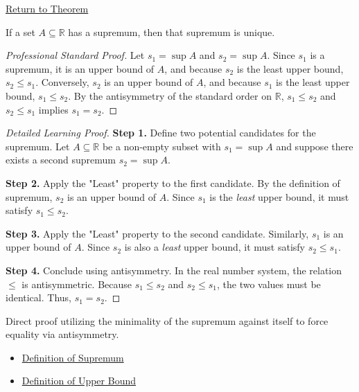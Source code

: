 \newpage
{}
\label{prf:uniqueness-of-the-supremum}

\begin{remark*}[Return]
\hyperref[prop:uniqueness-of-the-supremum]{Return to Theorem}
\end{remark*}

\begin{proposition*}
If a set $A \subseteq \mathbb{R}$ has a supremum, then that supremum is unique.
\end{proposition*}

\begin{proof}[Professional Standard Proof]
\LRAProofBodyStart
Let $s_1 = \sup A$ and $s_2 = \sup A$. Since $s_1$ is a supremum, it is an upper bound of $A$, and because $s_2$ is the least upper bound, $s_2 \le s_1$. Conversely, $s_2$ is an upper bound of $A$, and because $s_1$ is the least upper bound, $s_1 \le s_2$. By the antisymmetry of the standard order on $\mathbb{R}$, $s_1 \le s_2$ and $s_2 \le s_1$ implies $s_1 = s_2$.
\end{proof}

\begin{proof}[Detailed Learning Proof]
\LRAProofBodyStart

\textbf{Step 1.} Define two potential candidates for the supremum.
Let $A \subseteq \mathbb{R}$ be a non-empty subset with $s_1 = \sup A$ and suppose there exists a second supremum $s_2 = \sup A$.

\textbf{Step 2.} Apply the "Least" property to the first candidate.
By the definition of supremum, $s_2$ is an upper bound of $A$. Since $s_1$ is the \textit{least} upper bound, it must satisfy $s_1 \le s_2$.

\textbf{Step 3.} Apply the "Least" property to the second candidate.
Similarly, $s_1$ is an upper bound of $A$. Since $s_2$ is also a \textit{least} upper bound, it must satisfy $s_2 \le s_1$.

\textbf{Step 4.} Conclude using antisymmetry.
In the real number system, the relation $\le$ is antisymmetric. Because $s_1 \le s_2$ and $s_2 \le s_1$, the two values must be identical. Thus, $s_1 = s_2$.
\end{proof}

\begin{remark*}
Direct proof utilizing the minimality of the supremum against itself to force equality via antisymmetry.
\end{remark*}

\begin{dependencies}
\begin{itemize}
  \item \hyperref[def:supremum]{Definition of Supremum}
  \item \hyperref[def:upper-bound]{Definition of Upper Bound}
\end{itemize}
\end{dependencies}

\clearpage
